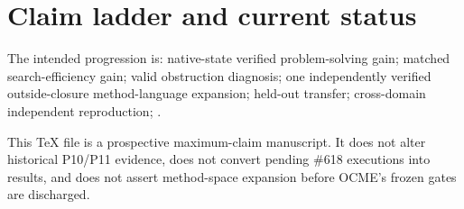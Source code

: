 \section{Claim ladder and current status}
The intended progression is: native-state verified problem-solving gain; matched search-efficiency gain; valid obstruction diagnosis; one independently verified outside-closure method-language expansion; held-out transfer; cross-domain independent reproduction;
\textbf{}.

This TeX file is a prospective maximum-claim manuscript. It does not alter historical P10/P11 evidence, does not convert pending \#618 executions into results, and does not assert method-space expansion before OCME's frozen gates are discharged.
